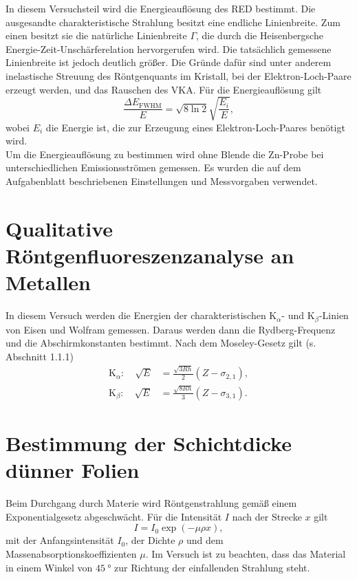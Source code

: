 In diesem Versuchsteil wird die Energieauflösung des RED bestimmt. Die ausgesandte charakteristische Strahlung besitzt eine endliche Linienbreite. Zum einen besitzt sie die natürliche Linienbreite $\Gamma$, die durch die Heisenbergsche Energie-Zeit-Unschärferelation hervorgerufen wird.
Die tatsächlich gemessene Linienbreite ist jedoch deutlich größer. Die Gründe dafür sind unter anderem inelastische Streuung des Röntgenquants im Kristall, bei der Elektron-Loch-Paare erzeugt werden, und das Rauschen des VKA.
Für die Energieauflösung gilt \cite{litmap}
\begin{equation}
 \frac{\Delta E_{\textrm{FWHM}}}{E} = \sqrt{8\ln2}\sqrt{\frac{E_{i}}{E}},
\end{equation}
wobei $E_{i}$ die Energie ist, die zur Erzeugung eines Elektron-Loch-Paares benötigt wird.\\
Um die Energieauflösung zu bestimmen wird ohne Blende die Zn-Probe bei unterschiedlichen Emissionsströmen gemessen. Es wurden die auf dem Aufgabenblatt beschriebenen Einstellungen und Messvorgaben verwendet.

\section{Qualitative Röntgenfluoreszenzanalyse an Metallen}

In diesem Versuch werden die Energien der charakteristischen K$_{\alpha}$- und K$_{\beta}$-Linien von Eisen und Wolfram gemessen. Daraus werden dann die Rydberg-Frequenz und die Abschirmkonstanten bestimmt.
Nach dem Moseley-Gesetz gilt (s. Abschnitt 1.1.1)
\begin{align}
 \textrm{K}_{\alpha}: \quad \sqrt{E} &= \frac{\sqrt{3Rh}}{2}\left(Z-\sigma_{2,1}\right), \\ 
 \textrm{K}_{\beta}: \quad \sqrt{E} &= \frac{\sqrt{8Rh}}{3}\left(Z-\sigma_{3,1}\right).
\end{align}

\section{Bestimmung der Schichtdicke dünner Folien}

Beim Durchgang durch Materie wird Röntgenstrahlung gemäß einem Exponentialgesetz abgeschwächt. Für die Intensität $I$ nach der Strecke $x$ gilt
\begin{equation}
 I = I_{0}\exp(-\mu\rho x),
\end{equation}
mit der Anfangsintensität $I_{0}$, der Dichte $\rho$ und dem Massenabsorptionskoeffizienten $\mu$. Im Versuch ist zu beachten, dass das Material in einem Winkel von $\SI{45}{\degree}$ zur Richtung der einfallenden Strahlung steht.




